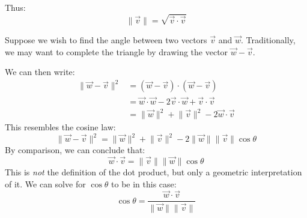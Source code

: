 \begin{itemize}
\begin{equation}
    \end{equation}
    Thus:
    \begin{equation}
        \lVert \vec{v} \rVert = \sqrt{\vec{v}\cdot\vec{v}}
        \label{eq:}
    \end{equation}
    \begin{example}
        Suppose we wish to find the angle between two vectors $\vec{v}$ and $\vec{w}$. Traditionally, we may want to complete the triangle by drawing the vector $\vec{w}-\vec{v}$.
        \begin{center}
        \end{center}
        We can then write:
        \begin{align}
            \lVert \vec{w}-\vec{v} \rVert^2 &= (\vec{w}-\vec{v})\cdot (\vec{w}-\vec{v}) \\ 
            &= \vec{w}\cdot\vec{w}-2\vec{v}\cdot\vec{w}+\vec{v}\cdot\vec{v} \\ 
            &=\lVert \vec{w} \rVert ^2 + \lVert \vec{v} \rVert^2-2\vec{w}\cdot\vec{v}
        \end{align}
        This resembles the cosine law:
        \begin{equation}
            \lVert \vec{w}-\vec{v}\rVert^2 = \lVert \vec{w}\rVert^2+\lVert \vec{v} \rVert^2 - 2\lVert \vec{w}\rVert \lVert \vec{v} \rVert \cos\theta
            \label{eq:}
        \end{equation}
        By comparison, we can conclude that:
        \begin{equation}
            \vec{w}\cdot\vec{v} = \lVert \vec{v} \rVert \lVert \vec{w} \rVert \cos\theta
            \label{eq:}
        \end{equation}
        This is \textit{not} the definition of the dot product, but only a geometric interpretation of it. We can solve for $\cos\theta$ to be in this case:
        \begin{equation}
            \cos\theta = \frac{\vec{w}\cdot\vec{v}}{\lVert \vec{w} \rVert \lVert \vec{v} \rVert}
            \label{eq:}
        \end{equation}
    \end{example}

\end{itemize}
